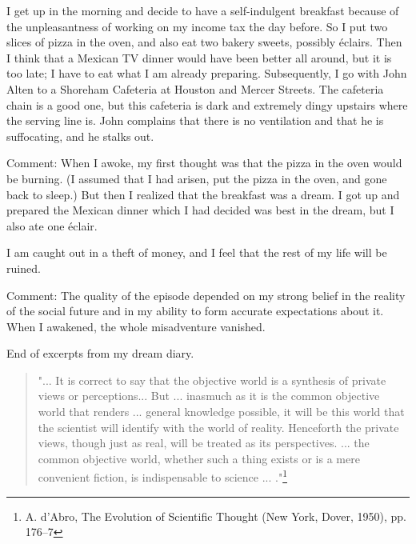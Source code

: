 \documentclass[10pt,twoside,draft]{memoir}
\begin{document}
{{

I get up in the morning and decide to have a self-indulgent breakfast 
because of the unpleasantness of working on my income tax the day before. 
So I put two slices of pizza in the oven, and also eat two bakery sweets, 
possibly \'{e}clairs. Then I think that a Mexican TV dinner would have been 
better all around, but it is too late; I have to eat what I am already preparing. 
Subsequently, I go with John Alten to a Shoreham Cafeteria at Houston and 
Mercer Streets. The cafeteria chain is a good one, but this cafeteria is dark 
and extremely dingy upstairs where the serving line is. John complains that 
there is no ventilation and that he is suffocating, and he stalks out. 

Comment: When I awoke, my first thought was that the pizza in the oven 
would be burning. (I assumed that I had arisen, put the pizza in the oven, 
and gone back to sleep.) But then I realized that the breakfast was a dream. I 
got up and prepared the Mexican dinner which I had decided was best in the 
dream, but I also ate one \'{e}clair. 


I am caught out in a theft of money, and I feel that the rest of my life 
will be ruined. 

Comment: The quality of the episode depended on my 
strong belief in the reality of the social future and in my ability to form 
accurate expectations about it. When I awakened, the whole misadventure 
vanished. 


End of excerpts from my dream diary.

\begin{quotation}
"... It is correct to say that the objective world is a synthesis of private views 
or perceptions... But ... inasmuch as it is the common objective world that 
renders ... general knowledge possible, it will be this world that the scientist 
will identify with the world of reality. Henceforth the private views, though 
just as real, will be treated as its perspectives. ... the common objective 
world, whether such a thing exists or is a mere convenient fiction, is 
indispensable to science ... 
."\footnote{A. d'Abro, The Evolution of Scientific Thought (New York, Dover, 1950), pp. 176--7}
\end{quotation}


}}
\end{document}
